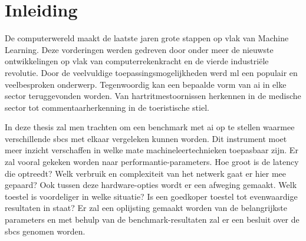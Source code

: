 \chapter{Inleiding}
De computerwereld maakt de laatste jaren grote stappen op vlak van Machine Learning\cite{Minar18}. Deze vorderingen werden gedreven door onder meer de nieuwste ontwikkelingen op vlak van computerrekenkracht en de vierde industri\"ele revolutie\cite{bloem2014fourth}. Door de veelvuldige toepassingsmogelijkheden werd \gls{ml} een populair en veelbesproken onderwerp. Tegenwoordig kan een bepaalde vorm van \gls{ai} in elke sector teruggevonden worden\cite{russell2016artificial}. Van hartritmestoornissen herkennen in de medische sector tot commentaarherkenning in de toeristische stiel. 

In deze thesis zal men trachten om een benchmark met \gls{ai} op te stellen waarmee verschillende \gls{sbc}s met elkaar vergeleken kunnen worden. Dit instrument moet meer inzicht verschaffen in welke mate machineleertechnieken toepasbaar zijn. Er zal vooral gekeken worden naar performantie-parameters. Hoe groot is de latency die optreedt? Welk verbruik en complexiteit van het netwerk gaat er hier mee gepaard? Ook tussen deze hardware-opties wordt er een afweging gemaakt. Welk toestel is voordeliger in welke situatie? Is een goedkoper toestel tot evenwaardige resultaten in staat? Er zal een oplijsting gemaakt worden van de belangrijkste parameters en met behulp van de benchmark-resultaten zal er een besluit over de \gls{sbc}s genomen worden.

